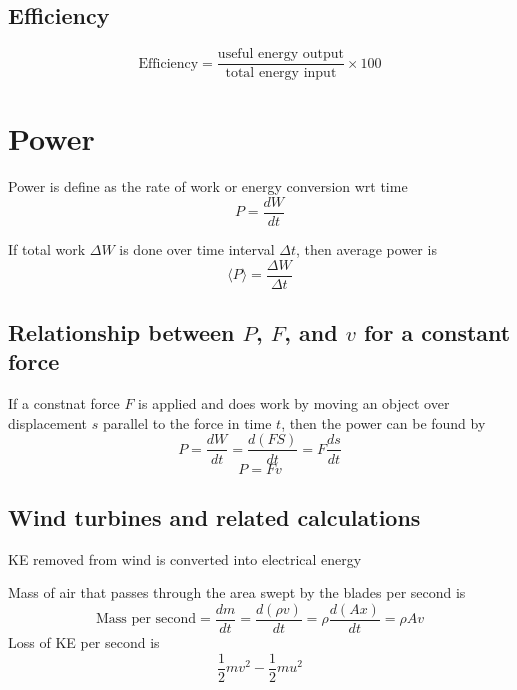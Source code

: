\documentclass[a4paper, 10pt]{article}
\begin{document}
\subsection{Efficiency}
\[
   \text{Efficiency} = \frac{\text{useful energy output}}{\text{total energy input}} \times 100%
\]


\section{Power}
\begin{framed}
   Power is define as the rate of work or energy conversion wrt time
   \[
   P = \frac{dW}{dt}
   \]

   If total work $\Delta W$ is done over time interval $\Delta t$, then average power is
   \[
      \langle P \rangle = \frac{\Delta W}{\Delta t}
   \]
   
\end{framed}	

\subsection{Relationship between $P$, $F$, and $v$ for a constant force}
If a constnat force $F$ is applied and does work by moving an object over displacement $s$ parallel to the force in time $t$, then the power can be found by
\[
   P = \frac{dW}{dt} = \frac{d(FS)}{dt} = F \frac{ds}{dt}
\]
\[
P = Fv
\]


\subsection{Wind turbines and related calculations}
KE removed from wind is converted into electrical energy

Mass of air that passes through the area swept by the blades per second is
\[
   \text{Mass per second} = \frac{dm}{dt} = \frac{d(\rho v)}{dt} = \rho \frac{d(Ax)}{dt} = \rho A v
\]
Loss of KE per second is 
\[
   \frac{1}{2}mv^2 - \frac{1}{2} mu^2
\]
\end{document}
